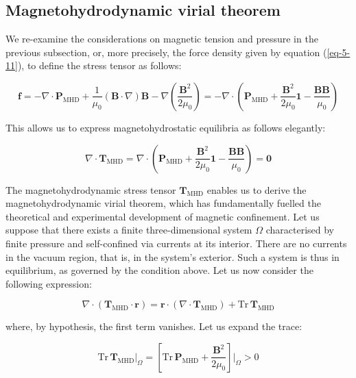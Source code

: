 \subsection{Magnetohydrodynamic virial theorem}

We re-examine the considerations on magnetic tension and pressure in the previous subsection, or, more precisely, the force density given by equation (\ref{eq-5-11}), to define the stress tensor as follows:

\begin{equation}
    \mathbf{f}=-\nabla\cdot\mathbf{P}_\text{MHD}+\frac{1}{\mu_0}(\mathbf{B}\cdot\nabla)\mathbf{B}-\nabla\left(\frac{\mathbf{B}^2}{2\mu_0}\right)=-\nabla\cdot\left(\mathbf{P}_\text{MHD}+\frac{\mathbf{B}^2}{2\mu_0} \mathbf{1}-\frac{\mathbf{B}\mathbf{B}}{\mu_0}\right)
\end{equation}

This allows us to express magnetohydrostatic equilibria as follows elegantly:

\begin{equation}
    \nabla\cdot\boldsymbol{\mathbf{T}}_\text{MHD}=\nabla\cdot\left(\mathbf{P}_\text{MHD}+\frac{\mathbf{B}^2}{2\mu_0} \mathbf{1}-\frac{\mathbf{B}\mathbf{B}}{\mu_0}\right)=\mathbf{0}
\end{equation}

The magnetohydrodynamic stress tensor $\mathbf{{T}}_\text{MHD}$ enables us to derive the magnetohydrodynamic virial theorem, which has fundamentally fuelled the theoretical and experimental development of magnetic confinement. Let us suppose that there exists a finite three-dimensional system $\Omega$ characterised by finite pressure and self-confined via currents at its interior. There are no currents in the vacuum region, that is, in the system's exterior. Such a system is thus in equilibrium, as governed by the condition above. Let us now consider the following expression:

\begin{equation}
    \nabla\cdot(\mathbf{T}_\text{MHD}\cdot\mathbf{r})=\mathbf{r}\cdot(\nabla\cdot\mathbf{T}_\text{MHD})+\text{Tr}\,\mathbf{T}_\text{MHD}
\end{equation}

where, by hypothesis, the first term vanishes. Let us expand the trace:

\begin{equation}
    \text{Tr}\,\mathbf{T}_\text{MHD}\bigr|_\Omega=\left[\text{Tr}\,\mathbf{P}_\text{MHD}+\frac{\mathbf{B}^2}{2\mu_0}\right]\Biggr|_\Omega>0
\end{equation}

